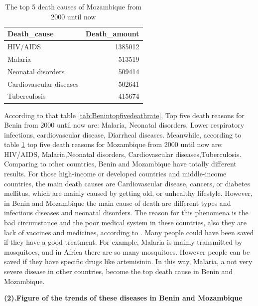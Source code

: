 \documentclass[11pt,a4paper,]{article}
\begin{document}
\begin{table}

\caption{\label{tab:Mozambiquetopfivedeathrate}The top 5 death causes of Mozambique from 2000 until now}
\centering
\begin{tabular}[t]{l|r}
\hline
Death\_cause & Death\_amount\\
\hline
HIV/AIDS & 1385012\\
\hline
Malaria & 513519\\
\hline
Neonatal disorders & 509414\\
\hline
Cardiovascular diseases & 502641\\
\hline
Tuberculosis & 415674\\
\hline
\end{tabular}
\end{table}

According to that table \ref{tab:Benintopfivedeathrate}, Top five death reasons for Benin from 2000 until now are: Malaria, Neonatal disorders, Lower respiratory infections, cardiovascular disease, Diarrheal diseases. Meanwhile, according to table \ref{tab:Mozambiquetopfivedeathrate} top five death reasons for Mozambique from 2000 until now are: HIV/AIDS, Malaria,Neonatal disorders, Cardiovascular diseases,Tuberculosis. Comparing to other countries, Benin and Mozambique have totally different results. For those high-income or developed countries and middle-income countries, the main death causes are Cardiovascular disease, cancers, or diabetes mellitus, which are mainly caused by getting old, or unhealthy lifestyle. However, in Benin and Mozambique the main cause of death are different types and infectious diseases and neonatal disorders. The reason for this phenomena is the bad circumstance and the poor medical system in these countries, also they are lack of vaccines and medicines, according to \textcite{mbaye2019telling}. Many people could have been saved if they have a good treatment. For example, Malaria is mainly transmitted by mosquitoes, and in Africa there are so many mosquitoes. However people can be saved if they have specific drugs like artemisinin. In this way, Malaria, a not very severe disease in other countries, become the top death cause in Benin and Mozambique.

\textbf{(2).Figure of the trends of these diseases in Benin and Mozambique}
\end{document}
